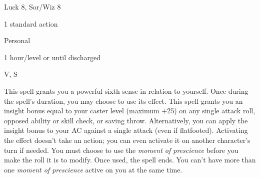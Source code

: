 
\begin{description*}
\item[Level:] Luck 8, Sor/Wiz 8
\item[Casting Time:] 1 standard action
\item[Range:] Personal
\item[Duration:] 1 hour/level or until discharged
\item[Components:] V, S
\end{description*}

This spell grants you a powerful sixth sense in relation to yourself. Once during
the spell's duration, you may choose to use its effect. This spell grants you an
insight bonus equal to your caster level (maximum +25) on any single attack roll,
opposed ability or skill check, or saving throw. Alternatively, you can apply the
insight bonus to your AC against a single attack (even if flatfooted). Activating
the effect doesn't take an action; you can even activate it on another character's
turn if needed. You must choose to use the \textit{moment of prescience} before
you make the roll it is to modify. Once used, the spell ends.
You can't have more than one \textit{moment of prescience} active on you at the
same time.